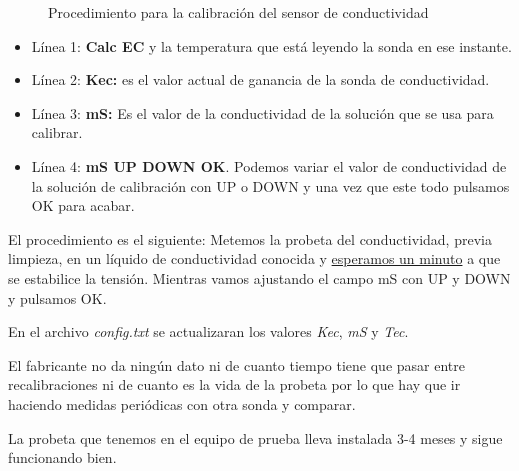 \begin{figure}[htbp!] 
\caption{Procedimiento para la calibración del sensor de conductividad}\label{patalla:EC} 
\end{figure}

\begin{itemize}
\item Línea 1: \textbf{Calc EC} y la temperatura que está leyendo la sonda en ese instante.
\item Línea 2: \textbf{Kec:} es el valor actual de ganancia de la sonda de conductividad.
\item Línea 3: \textbf{mS:} Es el valor de la conductividad de la solución que se usa para calibrar.
\item Línea 4: \textbf{mS UP DOWN OK}. Podemos variar el valor de conductividad de la solución de calibración con UP o DOWN y una vez que este todo pulsamos OK para acabar.
\end{itemize}

El procedimiento es el siguiente: Metemos la probeta del conductividad, previa limpieza, en un líquido de conductividad conocida y \underline{esperamos un minuto} a que se estabilice la tensión. Mientras vamos ajustando el campo mS con UP y DOWN y pulsamos OK.

En el archivo \emph{config.txt} se actualizaran los valores \emph{Kec}, \emph{mS} y \emph{Tec}.

\begin{tcolorbox}
[colback=red!5!white,colframe=red!75!black,fonttitle=\bfseries,title=VIDA DEL SENSOR DE CONDUCTIVIDAD]

El fabricante no da ningún dato ni de cuanto tiempo tiene que pasar entre recalibraciones ni de cuanto es la vida de la probeta por lo que hay que ir haciendo medidas periódicas con otra sonda y comparar.

La probeta que tenemos en el equipo de prueba lleva instalada 3-4 meses y sigue funcionando bien.

\end{tcolorbox}